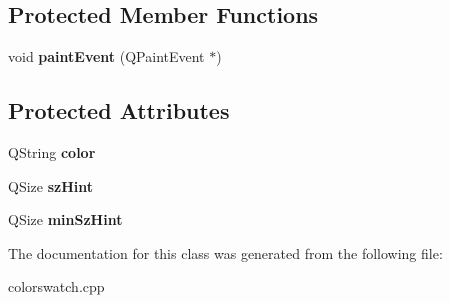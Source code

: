 \subsection*{Protected Member Functions}
\begin{DoxyCompactItemize}
\item 
\hypertarget{class_color_dock_af228e7700f3fb422a22770b170a93400}{void {\bfseries paint\-Event} (Q\-Paint\-Event $\ast$)}\label{class_color_dock_af228e7700f3fb422a22770b170a93400}

\end{DoxyCompactItemize}
\subsection*{Protected Attributes}
\begin{DoxyCompactItemize}
\item 
\hypertarget{class_color_dock_aea4e5ea45303ea9b34da836180f6158f}{Q\-String {\bfseries color}}\label{class_color_dock_aea4e5ea45303ea9b34da836180f6158f}

\item 
\hypertarget{class_color_dock_aea0335333213f94689cc827db1a8d43e}{Q\-Size {\bfseries sz\-Hint}}\label{class_color_dock_aea0335333213f94689cc827db1a8d43e}

\item 
\hypertarget{class_color_dock_aaa99d4fc29b1e011fdfdc562f93ffe90}{Q\-Size {\bfseries min\-Sz\-Hint}}\label{class_color_dock_aaa99d4fc29b1e011fdfdc562f93ffe90}

\end{DoxyCompactItemize}


The documentation for this class was generated from the following file\-:\begin{DoxyCompactItemize}
\item 
colorswatch.\-cpp\end{DoxyCompactItemize}
